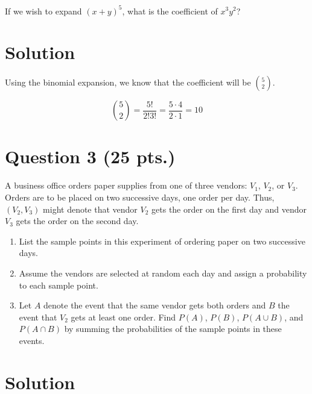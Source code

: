 \documentclass[11pt]{article}
\theoremstyle{definition}
\begin{document}
If we wish to expand $(x + y)^5$, what is the coefficient of $x^3y^2$?

\section*{Solution}

Using the binomial expansion, we know that the coefficient will be ${5 \choose 2}$.

$$
	{5 \choose 2} = \frac{5!}{2!3!} = \frac{5\cdot4}{2\cdot1} = 10
$$

\newpage

\section*{Question 3 (25 pts.)}

A business office orders paper supplies from one of three vendors: $V_1$, $V_2$, or $V_3$. Orders are to be placed on two successive days, one order per day. Thus, $(V_2, V_3)$ might denote that vendor $V_2$ gets the order on the first day and vendor $V_3$ gets the order on the second day.

\begin{enumerate}
	\item List the sample points in this experiment of ordering paper on two successive days.
	\item Assume the vendors are selected at random each day and assign a probability to each sample point.
	\item Let $A$ denote the event that the same vendor gets both orders and $B$ the event that $V_2$ gets at least one order. Find $P(A)$, $P(B)$, $P(A \cup B)$, and $P(A \cap B)$ by summing the probabilities of the sample points in these events.
\end{enumerate}

\section*{Solution}
\end{document}
